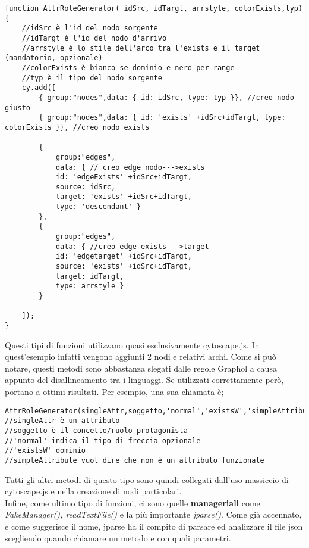 \documentclass[Lau,binding=0.6cm]{sapthesis}
\begin{document}
\begin{verbatim}
function AttrRoleGenerator( idSrc, idTargt, arrstyle, colorExists,typ){ 
	//idSrc è l'id del nodo sorgente
	//idTargt è l'id del nodo d'arrivo
	//arrstyle è lo stile dell'arco tra l'exists e il target (mandatorio, opzionale)
	//colorExists è bianco se dominio e nero per range 
	//typ è il tipo del nodo sorgente
    cy.add([
        { group:"nodes",data: { id: idSrc, type: typ }}, //creo nodo giusto
        { group:"nodes",data: { id: 'exists' +idSrc+idTargt, type: colorExists }}, //creo nodo exists

        {   
            group:"edges",
            data: { // creo edge nodo--->exists
            id: 'edgeExists' +idSrc+idTargt, 
            source: idSrc,
            target: 'exists' +idSrc+idTargt,
            type: 'descendant' } 
        },
        { 
            group:"edges",                    
            data: { //creo edge exists--->target
            id: 'edgetarget' +idSrc+idTargt, 
            source: 'exists' +idSrc+idTargt,
            target: idTargt,
            type: arrstyle } 
        }

    ]);
}
\end{verbatim}
Questi tipi di funzioni utilizzano quasi esclusivamente cytoscape.js. In quest'esempio infatti vengono aggiunti 2 nodi e relativi archi. Come si può notare, questi metodi sono abbastanza slegati dalle regole Graphol a causa appunto del disallineamento tra i linguaggi. Se utilizzati correttamente però, portano a ottimi risultati. Per esempio, una sua chiamata è;
\begin{verbatim}
AttrRoleGenerator(singleAttr,soggetto,'normal','existsW','simpleAttribute');
//singleAttr è un attributo 
//soggetto è il concetto/ruolo protagonista
//'normal' indica il tipo di freccia opzionale
//'existsW' dominio
//simpleAttribute vuol dire che non è un attributo funzionale
\end{verbatim}
Tutti gli altri metodi di questo tipo sono quindi collegati dall'uso massiccio di cytoscape.js e nella creazione di nodi particolari.
\\Infine, come ultimo tipo di funzioni, ci sono quelle \textbf{manageriali} come \textit{FakeManager(), readTextFile()} e la più importante \textit{jparse()}.
Come già accennato, e come suggerisce il nome, jparse ha il compito di parsare ed analizzare il file json scegliendo quando chiamare un metodo e con quali parametri.


\backmatter
\end{document}
